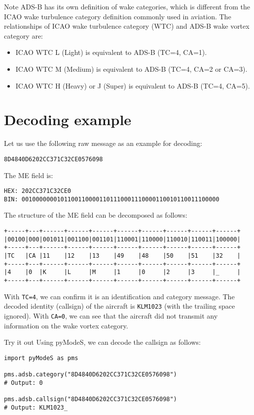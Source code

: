 Note ADS-B has its own definition of wake categories, which is different from the ICAO wake turbulence category definition commonly used in aviation. The relationships of ICAO wake turbulence category (WTC) and ADS-B wake vortex category are:

\begin{itemize}
    \item ICAO WTC L (Light) is equivalent to ADS-B (TC=4, CA=1). 
    \item ICAO WTC M (Medium) is equivalent to ADS-B (TC=4, CA=2 or CA=3). 
    \item ICAO WTC H (Heavy) or J (Super) is equivalent to ADS-B (TC=4, CA=5). 
\end{itemize}


\section{Decoding example}

Let us use the following raw message as an example for decoding:

\begin{verbatim}
8D4840D6202CC371C32CE0576098
\end{verbatim}

The ME field is:

\begin{verbatim}
HEX: 202CC371C32CE0
BIN: 00100000001011001100001101110001110000110010110011100000
\end{verbatim}

The structure of the ME field can be decomposed as follows:

\begin{verbatim}
+-----+---+------+------+------+------+------+------+------+------+
|00100|000|001011|001100|001101|110001|110000|110010|110011|100000|
+-----+---+------+------+------+------+------+------+------+------+
|TC   |CA |11    |12    |13    |49    |48    |50    |51    |32    |
+-----+---+------+------+------+------+------+------+------+------+
|4    |0  |K     |L     |M     |1     |0     |2     |3     |_     |
+-----+---+------+------+------+------+------+------+------+------+
\end{verbatim}

With \texttt{TC=4}, we can confirm it is an identification and category message. The decoded identity (callsign) of the aircraft is \texttt{KLM1023} (with the trailing space ignored). With \texttt{CA=0}, we can see that the aircraft did not transmit any information on the wake vortex category.

\begin{notebox}{Try it out}
Using pyModeS, we can decode the callsign as follows:

\begin{verbatim}
import pyModeS as pms

pms.adsb.category("8D4840D6202CC371C32CE0576098")
# Output: 0

pms.adsb.callsign("8D4840D6202CC371C32CE0576098")
# Output: KLM1023_
\end{verbatim}

\end{notebox}
 
  